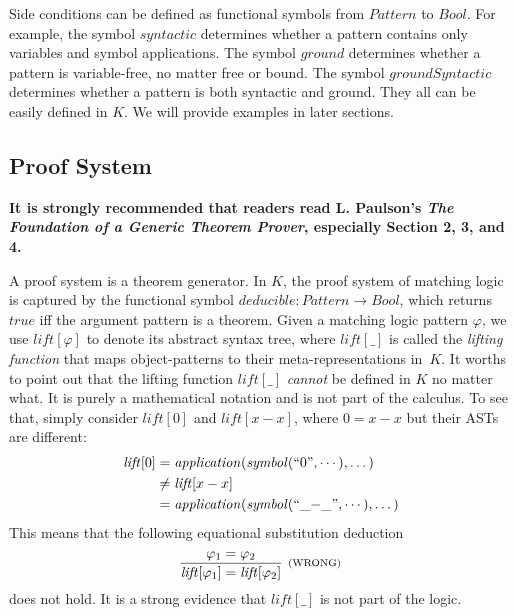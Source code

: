 \documentclass[UTF8]{article}
\newcommand{\comment}[1]
    {\par {\bfseries \color{blue} #1 \par}} %
\theoremstyle{plain}
\theoremstyle{definition}
\theoremstyle{remark}
\newcommand{\rl}[1]{\text{\scriptsize{(#1)}}}
\begin{document}
Side conditions can be defined as functional symbols from $\mathit{Pattern}$ to $\mathit{Bool}$. 
For example, the symbol $\mathit{syntactic}$ determines whether a pattern contains only variables and symbol applications. 
The symbol $\mathit{ground}$ determines whether a pattern is variable-free, no matter free or bound. 
The symbol $\mathit{groundSyntactic}$ determines whether a pattern is both syntactic and ground.
They all can be easily defined in $K$.
We will provide examples in later sections. 

\subsection{Proof System}
\comment{It is strongly recommended that readers read L. Paulson's \emph{The Foundation of a Generic Theorem Prover}, especially Section 2, 3, and 4.}

A proof system is a theorem generator. 
In $K$, the proof system of matching logic is captured by the functional symbol $\mathit{deducible} \colon \mathit{Pattern} \to \mathit{Bool}$, which returns $\mathit{true}$ iff the argument pattern is a theorem. 
Given a matching logic pattern $\varphi$, we use $\mathit{lift[\varphi]}$ to 
denote its 
abstract syntax tree, where $\mathit{lift}[\_]$ is called the \emph{lifting 
function}
that maps object-patterns to their meta-representations in~$K$.
It worths to point out that the lifting function $\mathit{lift}[\_]$  \emph{cannot} be defined in $K$ no matter what.
It is purely a mathematical notation and is not part of the calculus.
To see that, simply consider $\mathit{lift}[0]$ and $\mathit{lift}[x - x]$, 
where $0 = 
x - x$ but their ASTs are different:
\begin{align*}
\mathit{lift}[0]
&= \mathit{application}(\mathit{symbol}(``\text{0}", \cdots),\dots) \\
&\neq \mathit{lift}[x - x] \\
&= \mathit{application}(\mathit{symbol}(``\text{\_$-$\_}",\cdots), \dots)
\end{align*}
This means that the following equational substitution deduction
$$
\infer[\rl{WRONG}]{\mathit{lift}[\varphi_1] = \mathit{lift}[\varphi_2]}
{\varphi_1 = \varphi_2}
$$
does not hold. It is a strong evidence that $\mathit{lift}[\_]$ is not part of 
the logic.
\end{document}
